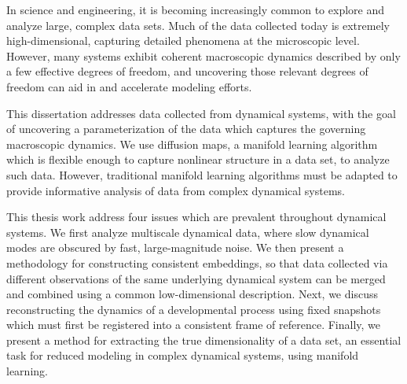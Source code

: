 

In science and engineering, it is becoming increasingly common to explore and analyze large, complex data sets. 
%
Much of the data collected today is extremely high-dimensional, capturing detailed phenomena at the microscopic level. 
%
However, many systems exhibit coherent macroscopic dynamics described by only a few effective degrees of freedom, and uncovering those relevant degrees of freedom can aid in and accelerate modeling efforts. 

This dissertation addresses data collected from dynamical systems, with the goal of uncovering a parameterization of the data which captures the governing macroscopic dynamics.
%
We use diffusion maps, a manifold learning algorithm which is flexible enough to capture nonlinear structure in a data set, to analyze such data. 
%
However, traditional manifold learning algorithms must be adapted to provide informative analysis of data from complex dynamical systems. 

This thesis work address four issues which are prevalent throughout dynamical systems. 
%
We first analyze multiscale dynamical data, where slow dynamical modes are obscured by fast, large-magnitude noise. 
%
We then present a methodology for constructing consistent embeddings, so that data collected via different observations of the same underlying dynamical system can be merged and combined using a common low-dimensional description. 
%
Next, we discuss reconstructing the dynamics of a developmental process using fixed snapshots which must first be registered into a consistent frame of reference. 
%
Finally, we present a method for extracting the true dimensionality of a data set, an essential task for reduced modeling in complex dynamical systems, using manifold learning. 